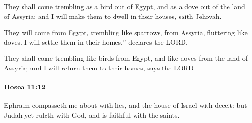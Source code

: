			\begin{versebox}
					\item[BHS] 
					\item[LXX] 
					\item[ASV] They shall come trembling as a bird out of Egypt, and as a dove out of the land of Assyria; and I will make them to dwell in their houses, saith Jehovah.
					\item[NIV] They will come from Egypt, trembling like sparrows, from Assyria, fluttering like doves. I will settle them in their homes,” declares the LORD.
					\item[NRSV] They shall come trembling like birds from Egypt, and like doves from the land of Assyria; and I will return them to their homes, says the LORD.
			\end{versebox}

		\paragraph{Hosea 11:12} %
			\label{HOSEA-11-12}

			Ephraim compasseth me about with lies, and the house of Israel with deceit: but Judah yet ruleth with God, and is faithful with the saints.

